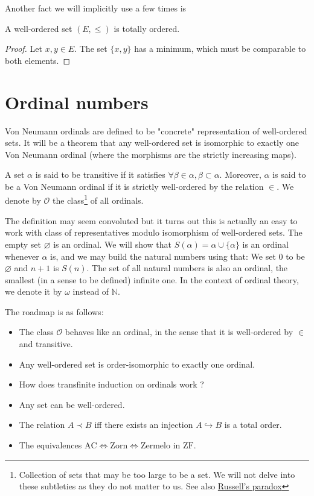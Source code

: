 \documentclass{article}
\begin{document}
Another fact we will implicitly use a few times is
\begin{proposition}
    A well-ordered set $(E, \leq)$ is totally ordered.
\end{proposition}

\begin{proof}
    Let $x, y \in E$. The set $\{x, y\}$ has a minimum, which must be comparable to both elements.
\end{proof}

\section{Ordinal numbers}
Von Neumann ordinals are defined to be "concrete" representation of well-ordered sets. It will be a theorem that any well-ordered set is isomorphic to exactly one Von Neumann ordinal (where the morphisms are the strictly increasing maps). 
\begin{definition}
A set $\alpha$ is said to be transitive if it satisfies $\forall \beta \in \alpha, \beta \subset \alpha$. Moreover, $\alpha$ is said to be a Von Neumann ordinal if it is strictly well-ordered by the relation $\in$. We denote by $\mathcal{O}$ the class\footnote{Collection of sets that may be too large to be a set. We will not delve into these subtleties as they do not matter to us. See also \href{https://en.wikipedia.org/wiki/Russell\%27s_paradox}{Russell's paradox}} of all ordinals.
\end{definition}

The definition may seem convoluted but it turns out this is actually an easy to work with class of representatives modulo isomorphism of well-ordered sets. The empty set $\varnothing$ is an ordinal. We will show that $S(\alpha) = \alpha \cup \{\alpha\}$ is an ordinal whenever $\alpha$ is, and we may build the natural numbers using that: We set $0$ to be $\varnothing$ and $n+1$ is $S(n)$. The set of all natural numbers is also an ordinal, the smallest (in a sense to be defined) infinite one. In the context of ordinal theory, we denote it by $\omega$ instead of $\mathbb{N}$.

The roadmap is as follows:
\begin{itemize}
    \item The class $\mathcal{O}$ behaves like an ordinal, in the sense that it is well-ordered by $\in$ and transitive.
    \item Any well-ordered set is order-isomorphic to exactly one ordinal.
    \item How does transfinite induction on ordinals work ?
    \item Any set can be well-ordered.
    \item The relation $A \prec B$ iff there exists an injection $A \hookrightarrow B$ is a total order.
    \item The equivalences $\mathrm{AC} \iff \mathrm{Zorn} \iff \mathrm{Zermelo}$ in $\mathrm{ZF}$.
\end{itemize}
\end{document}
